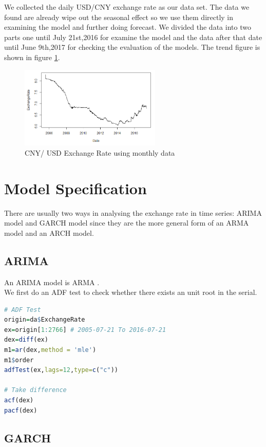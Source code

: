 \documentclass[12pt, a4paper, titlepage]{article}
\begin{document}
We collected the daily USD/CNY exchange rate as our data set. The data we found are already wipe out the seasonal effect so we use them directly in examining the model and further doing forecast. We divided the data into two parts one until July 21st,2016 for examine the model and the data after that date until June 9th,2017 for checking the evaluation of the models. The trend figure is shown in figure \ref{daily}.\\
\begin{figure}
\begin{center}
\caption{CNY/ USD Exchange Rate using monthly data}\label{daily}
\includegraphics[width=0.6\textwidth]{daily.png} 
\end{center}
\end{figure}

\section{Model Specification}
There are usually two ways in analysing the exchange rate in time series: ARIMA model and GARCH model since they are the more general form of an ARMA model and an ARCH model. 

\subsection{ARIMA}
An ARIMA model is ARMA .\\

We first do an ADF test to check whether there exists an unit root in the serial.
\begin{lstlisting}[language=R] 
# ADF Test
origin=da$ExchangeRate
ex=origin[1:2766] # 2005-07-21 To 2016-07-21
dex=diff(ex)
m1=ar(dex,method = 'mle')
m1$order
adfTest(ex,lags=12,type=c("c"))

# Take difference
acf(dex)
pacf(dex)
\end{lstlisting}

\subsection{GARCH}
\end{document}
